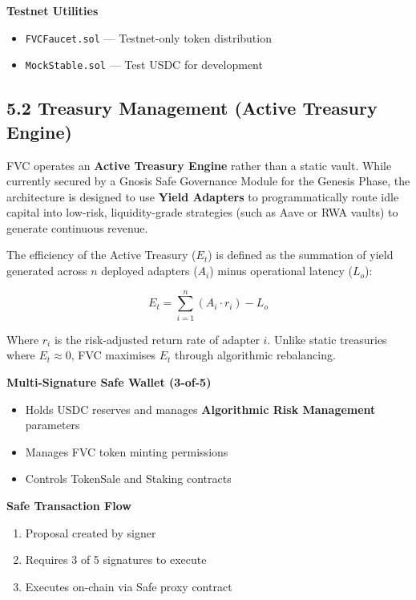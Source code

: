 \documentclass[
  paper=a4,
  ,captions=tableheading
]{scrartcl}
\newcommand{\passthrough}[1]{#1}
\providecommand{\tightlist}{%
  \setlength{\itemsep}{0pt}\setlength{\parskip}{0pt}}
\begin{document}
\textbf{Testnet Utilities}

\begin{itemize}
\tightlist
\item
  \passthrough{\lstinline!FVCFaucet.sol!} --- Testnet-only token distribution
\item
  \passthrough{\lstinline!MockStable.sol!} --- Test USDC for development
\end{itemize}

\subsection{5.2 Treasury Management (Active Treasury Engine)}\label{treasury-management}

FVC operates an \textbf{Active Treasury Engine} rather than a static vault. While currently secured by a Gnosis Safe Governance Module for the Genesis Phase, the architecture is designed to use \textbf{Yield Adapters} to programmatically route idle capital into low-risk, liquidity-grade strategies (such as Aave or RWA vaults) to generate continuous revenue.

The efficiency of the Active Treasury ($E_t$) is defined as the summation of yield generated across $n$ deployed adapters ($A_i$) minus operational latency ($L_o$):

\[
E_t = \sum_{i=1}^{n} (A_i \cdot r_i) - L_o
\]

Where $r_i$ is the risk-adjusted return rate of adapter $i$. Unlike static treasuries where $E_t \approx 0$, FVC maximises $E_t$ through algorithmic rebalancing.

\textbf{Multi-Signature Safe Wallet (3-of-5)}

\begin{itemize}
\tightlist
\item
  Holds USDC reserves and manages \textbf{Algorithmic Risk Management} parameters
\item
  Manages FVC token minting permissions
\item
  Controls TokenSale and Staking contracts
\end{itemize}

\textbf{Safe Transaction Flow}

\begin{enumerate}
\def\labelenumi{\arabic{enumi}.}
\tightlist
\item
  Proposal created by signer
\item
  Requires 3 of 5 signatures to execute
\item
  Executes on-chain via Safe proxy contract
\end{enumerate}
\end{document}

